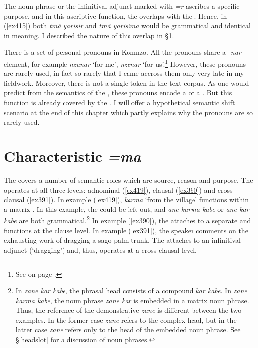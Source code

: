 The noun phrase or the infinitival adjunct marked with \emph{=r} ascribes a specific purpose, and in this ascriptive function, the  overlaps with the  . Hence, in (\ref{ex415}) both \emph{tmä yarisir} and \emph{tmä yarisima} would be grammatical and identical in meaning. I described the nature of this overlap in \S{}\ref{charcase}.%

There is a set of  personal pronouns in Komnzo. All the pronouns share a \emph{-nar} element, for example \emph{nzunar} `for me', \emph{nzenar} `for us'.\footnote{See  on page \pageref{perspron}.} However, these pronouns are rarely used, in fact so rarely that I came accross them only very late in my fieldwork. Moreover, there is not a single token in the text corpus. As one would predict from the semantics of the  , these pronouns encode a  or a . But this function is already covered by the  . I will offer a hypothetical semantic shift scenario at the end of this chapter which partly explains why the  pronouns are so rarely used.

\section{Characteristic \emph{=ma}} \label{charcase}

The   covers a number of semantic roles which are source, reason and purpose. The  operates at all three levels: adnominal (\ref{ex419}), clausal (\ref{ex390}) and cross-clausal (\ref{ex391}). In example (\ref{ex419}), \emph{karma} `from the village' functions within a matrix . In this example, the  could be left out, and \emph{ane karma kabe} or \emph{ane kar kabe} are both grammatical.\footnote{In \emph{zane kar kabe}, the phrasal head consists of a compound \emph{kar kabe}. In \emph{zane karma kabe}, the noun phrase \emph{zane kar} is embedded in a matrix noun phrase. Thus, the reference of the demonstrative \emph{zane} is different between the two examples. In the former case \emph{zane} refers to the complex head, but in the latter case \emph{zane} refers only to the head of the embedded noun phrase. See \S{}\ref{headslot} for a discussion of noun phrases.} In example (\ref{ex390}), the   attaches to a separate  and functions at the clause level. In example (\ref{ex391}), the speaker comments on the exhausting work of dragging a sago palm trunk. The   attaches to an infinitival adjunct (`dragging') and, thus, operates at a cross-clausal level.

